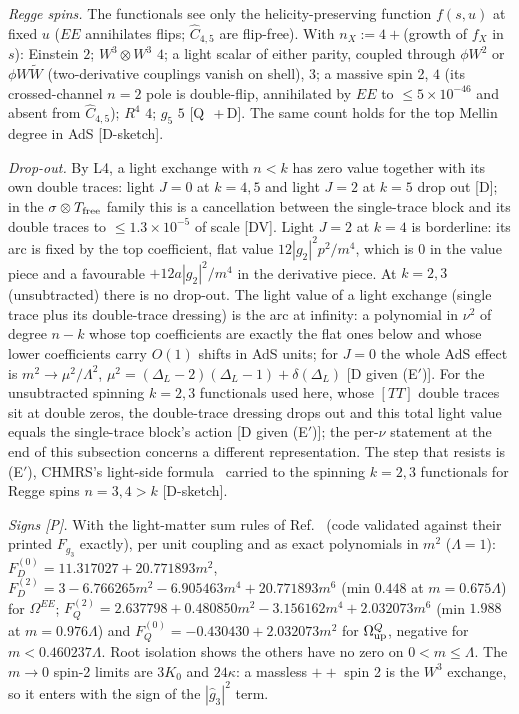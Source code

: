 \documentclass[aps,prl,onecolumn,superscriptaddress,nofootinbib]{revtex4-2}
\begin{document}
\emph{Regge spins.} The functionals see only the helicity-preserving function $f(s,u)$ at fixed $u$ ($EE$
annihilates flips; $\hat C_{4,5}$ are flip-free). With $n_X:=4+$(growth of $f_X$ in $s$): Einstein $2$; $W^3\otimes W^3$
$4$; a light scalar of either parity, coupled through $\phi W^2$ or $\phi W\tilde W$ (two-derivative couplings vanish
on shell), $3$; a massive spin 2, $4$ (its crossed-channel $n=2$ pole is double-flip, annihilated by $EE$ to
$\le5\times10^{-46}$ and absent from $\hat C_{4,5}$); $R^4$ $4$; $g_5$ $5$ [Q~\cite{CHLPS}\,+\,D]. The same count
holds for the top Mellin degree in AdS [D-sketch].

\emph{Drop-out.} By L4, a light exchange with $n<k$ has zero value together with its own double traces: light
$J=0$ at $k=4,5$ and light $J=2$ at $k=5$ drop out [D]; in the $\sigma\otimes T_{\rm free}$ family this is a
cancellation between the single-trace block and its double traces to $\le1.3\times10^{-5}$ of scale [DV]. Light
$J=2$ at $k=4$ is borderline: its arc is fixed by the top coefficient, flat value $12|g_2|^2p^2/m^4$, which is $0$
in the value piece and a favourable $+12a|g_2|^2/m^4$ in the derivative piece. At $k=2,3$ (unsubtracted) there is
no drop-out. The light value of a light exchange (single trace plus its double-trace dressing) is the arc at infinity: a polynomial
in $\nu^2$ of degree $n-k$ whose top coefficients are exactly the flat ones below and whose lower coefficients carry $O(1)$ shifts in
AdS units; for $J=0$ the whole AdS effect is $m^2\to\mu^2/\Lambda^2$, $\mu^2=(\Delta_L-2)(\Delta_L-1)+\delta(\Delta_L)$ [D given (E$'$)].
For the unsubtracted spinning $k=2,3$ functionals used here, whose $[TT]$ double traces sit at double zeros, the double-trace
dressing drops out and this total light value equals the single-trace block's action [D given (E$'$)]; the per-$\nu$ statement
at the end of this subsection concerns a different representation. The step that resists is (E$'$), CHMRS's light-side
formula~\cite{CHMRS} carried to the spinning $k=2,3$ functionals for Regge spins $n=3,4>k$ [D-sketch].

\emph{Signs [P].} With the light-matter sum rules of Ref.~\cite{CHLPS} (code validated against their printed
$F_{g_3}$ exactly), per unit coupling and as exact polynomials in $m^2$ ($\Lambda=1$):
$F_D^{(0)}=11.317027+20.771893m^2$, $F_D^{(2)}=3-6.766265m^2-6.905463m^4+20.771893m^6$ (min $0.448$ at
$m=0.675\Lambda$) for $\Omega^{EE}$; $F_Q^{(2)}=2.637798+0.480850m^2-3.156162m^4+2.032073m^6$ (min $1.988$ at $m=0.976\Lambda$) and
$F_Q^{(0)}=-0.430430+2.032073m^2$ for $\Omega^Q_{\rm up}$, negative for $m<0.460237\Lambda$. Root isolation shows the
others have no zero on $0<m\le\Lambda$. The $m\to0$ spin-2 limits are $3K_0$ and $24\kappa$: a massless $++$
spin 2 is the $W^3$ exchange, so it enters with the sign of the $|\hat g_3|^2$ term.
\end{document}
